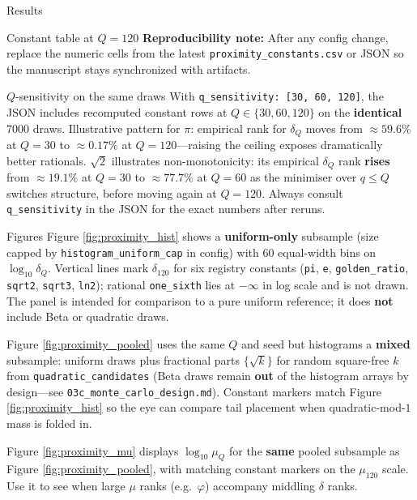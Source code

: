 \documentclass[
  ignorenonframetext,
]{beamer}
\begin{document}
\begin{frame}[fragile]{Results}
\begin{block}{Constant table at \(Q=120\)}
\textbf{Reproducibility note:} After any config change, replace the
numeric cells from the latest \texttt{proximity\_constants.csv} or JSON
so the manuscript stays synchronized with artifacts.
\end{block}

\begin{block}{\(Q\)-sensitivity on the same draws}
\protect{}\label{q-sensitivity-on-the-same-draws}
With \texttt{q\_sensitivity:\ {[}30,\ 60,\ 120{]}}, the JSON includes
recomputed constant rows at \(Q\in\{30,60,120\}\) on the
\textbf{identical} \(7000\) draws. Illustrative pattern for \(\pi\):
empirical rank for \(\delta_Q\) moves from \(\approx 59.6\%\) at
\(Q=30\) to \(\approx 0.17\%\) at \(Q=120\)---raising the ceiling
exposes dramatically better rationals. \(\sqrt{2}\) illustrates
non-monotonicity: its empirical \(\delta_Q\) rank \textbf{rises} from
\(\approx 19.1\%\) at \(Q=30\) to \(\approx 77.7\%\) at \(Q=60\) as the
minimiser over \(q\le Q\) switches structure, before moving again at
\(Q=120\). Always consult \texttt{q\_sensitivity} in the JSON for the
exact numbers after reruns.
\end{block}

\begin{block}{Figures}
\protect{}\label{figures}
Figure \ref{fig:proximity_hist} shows a \textbf{uniform-only} subsample
(size capped by \texttt{histogram\_uniform\_cap} in config) with \(60\)
equal-width bins on \(\log_{10}\delta_Q\). Vertical lines mark
\(\delta_{120}\) for six registry constants (\texttt{pi}, \texttt{e},
\texttt{golden\_ratio}, \texttt{sqrt2}, \texttt{sqrt3}, \texttt{ln2});
rational \texttt{one\_sixth} lies at \(-\infty\) in log scale and is not
drawn. The panel is intended for comparison to a pure uniform reference;
it does \textbf{not} include Beta or quadratic draws.

Figure \ref{fig:proximity_pooled} uses the same \(Q\) and seed but
histograms a \textbf{mixed} subsample: uniform draws plus fractional
parts \(\{\sqrt{k}\}\) for random square-free \(k\) from
\texttt{quadratic\_candidates} (Beta draws remain \textbf{out} of the
histogram arrays by design---see \texttt{03c\_monte\_carlo\_design.md}).
Constant markers match Figure \ref{fig:proximity_hist} so the eye can
compare tail placement when quadratic-mod-\(1\) mass is folded in.

Figure \ref{fig:proximity_mu} displays \(\log_{10}\mu_Q\) for the
\textbf{same} pooled subsample as Figure \ref{fig:proximity_pooled},
with matching constant markers on the \(\mu_{120}\) scale. Use it to see
when large \(\mu\) ranks (e.g.~\(\varphi\)) accompany middling
\(\delta\) ranks.


\end{block}
\end{frame}
\end{document}
